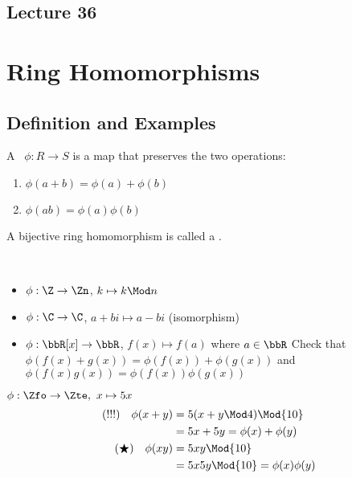 \subsection*{Lecture 36} %

\section{Ring Homomorphisms}
\subsection{Definition and Examples}
  \begin{definition}
    A \  \( \phi: R\to S \) is a map that preserves the two operations:
    \begin{enumerate}
      \item \( \phi(a+b) = \phi(a) + \phi(b) \)
      \item \( \phi(ab) = \phi(a)\phi(b) \)
    \end{enumerate}
    A bijective ring homomorphism is called a .
  \end{definition}

\begin{examples}\
  \begin{itemize}
    \item \( \phi:\Z\to\Zn \), \( k\mapsto k\Mod n \)
    \item \( \phi:\C\to\C \), \( a+bi\mapsto a-bi \) (isomorphism)
    \item \( \phi:\bbR[x]\to\bbR \), \( f(x)\mapsto f(a) \) where \( a\in\bbR \)
    Check that \( \phi(f(x) + g(x)) = \phi(f(x)) + \phi(g(x)) \) and \( \phi(f(x)g(x)) = \phi(f(x))\phi(g(x)) \)
  \end{itemize}
\end{examples}

\begin{example}
  \( \phi:\Zfo\to\Zte,\ x\mapsto 5x \)
  \begin{align*}
    (!!!)\quad \phi(x+y) &= 5(x+y\Mod 4) \Mod{10} \\
    &= 5x+5y = \phi(x)+\phi(y) \\
    (\bigstar)\quad \phi(xy) &= 5xy \Mod{10} \\
    &= 5x 5y \Mod{10} = \phi(x)\phi(y)
  \end{align*}
\end{example}

